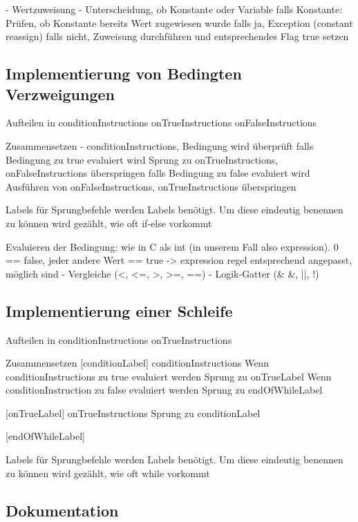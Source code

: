 	-	Wertzuweisung
		-	Unterscheidung, ob Konstante oder Variable
				falls Konstante:
					Prüfen, ob Konstante bereits Wert zugewiesen wurde
						falls ja, Exception (constant reassign)
						falls nicht, Zuweisung durchführen und entsprechendes Flag true setzen

\subsection{Implementierung von Bedingten Verzweigungen}
Aufteilen in
	conditionInstructions
	onTrueInstructions
	onFalseInstructions
	
Zusammensetzen
	-	conditionInstructions, Bedingung wird überprüft
		falls Bedingung zu true evaluiert wird
			Sprung zu onTrueInstructions, onFalseInstructions überspringen
		falls Bedingung zu false evaluiert wird
			Ausführen von onFalseInstructions, onTrueInstructions überspringen
	
Labels
	für Sprungbefehle werden Labels benötigt. Um diese eindeutig benennen zu können wird gezählt, wie oft if-else vorkommt
	


Evaluieren der Bedingung:
	wie in C als int (in unserem Fall also expression). 0 == false, jeder andere Wert == true
	 	-> expression regel entsprechend angepasst, möglich sind
	 		- Vergleiche (<, <=, >, >=, ==)
	 		- Logik-Gatter (\& \&, ||, !)


\subsection{Implementierung einer Schleife}
Aufteilen in
	conditionInstructions
	onTrueInstructions
	
Zusammensetzen
	[conditionLabel]
	conditionInstructions
		Wenn conditionInstructions zu true evaluiert werden
			Sprung zu onTrueLabel
		Wenn conditionInstruction zu false evaluiert werden
			Sprung zu endOfWhileLabel
	
	[onTrueLabel]
	onTrueInstructions
	Sprung zu conditionLabel	
			
	[endOfWhileLabel]

Labels
	für Sprungbefehle werden Labels benötigt. Um diese eindeutig benennen zu können wird gezählt, wie oft while vorkommt


\subsection{Dokumentation}

